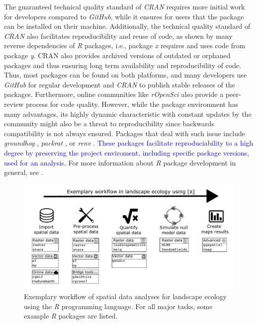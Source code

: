 \documentclass[smallextended]{svjour3}       %
\begin{document}
The guaranteed technical quality standard of \emph{CRAN} requires more initial work for developers compared to \emph{GitHub}, while it ensures for users that the package can be installed on their machine.
Additionally, the technical quality standard of \emph{CRAN} also facilitates reproducibility and reuse of code, as shown by many reverse dependencies of \emph{R} packages, i.e., package \emph{x} requires and uses code from package \emph{y}.
CRAN also provides archived versions of outdated or orphaned packages and thus ensuring long term availability and reproducibility of code.
Thus, most packages can be found on both platforms, and many developers use \emph{GitHub} for regular development and \emph{CRAN} to publish stable releases of the packages.
Furthermore, online communities like \emph{rOpenSci} also provide a peer-review process for code quality.
However, while the package environment has many advantages, its highly dynamic characteristic with constant updates by the community might also be a threat to reproducibility since backwards compatibility is not always ensured.
Packages that deal with such issue include \emph{groundhog} \cite{Simonsohn2021}, \emph{packrat} \cite{Ushey2018}, or \emph{renv} \cite{Ushey2020}.
\textcolor{blue}{These packages facilitate reproduciability to a high degree by preserving the project enviroment, including specific package versions, used for an analysis.}
For more information about \emph{R} package development in general, see \cite{Wickham2015}.



\begin{figure}
\includegraphics[width=\linewidth]{data/Figure_1} \caption{Exemplary workflow of spatial data analyses for landscape ecology using the \emph{R} programming language. For all major tasks, some example \emph{R} packages are listed.}\label{fig:fig-workflow}
\end{figure}
\end{document}
